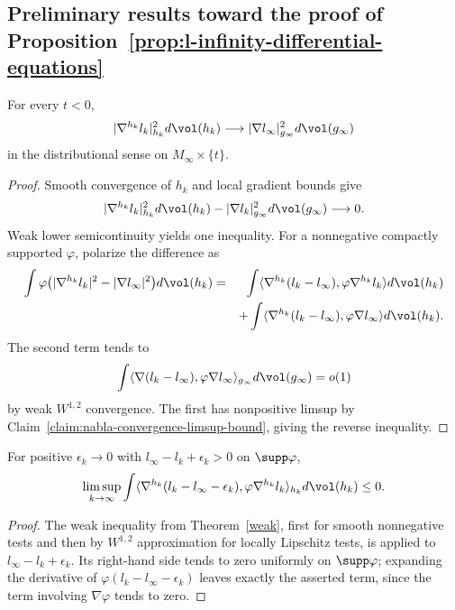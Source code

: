 \subsection{Preliminary results toward the proof of
Proposition~{\ref{prop:l-infinity-differential-equations}}}\label{sect9.2.3}

\begin{lemma}\label{lem:gradient-convergence-distributions}
\label{nablaconv}
For every $t<0$,
\[
 |\nabla^{h_k}l_k|_{h_k}^2d\vol(h_k)
 \longrightarrow |\nabla l_\infty|_{g_\infty}^2d\vol(g_\infty)
\]
in the distributional sense on $M_\infty\times\{t\}$.
\end{lemma}
\begin{proof}
\sketch Smooth convergence of $h_k$ and local gradient bounds give
\begin{equation}\label{firstdist}
 |\nabla^{h_k}l_k|_{h_k}^2d\vol(h_k)
 -|\nabla l_k|_{g_\infty}^2d\vol(g_\infty)\longrightarrow0.
\end{equation}
Weak lower semicontinuity yields one inequality. For a nonnegative
compactly supported $\varphi$, polarize the difference as
\begin{eqnarray}\label{11}
\int\varphi\bigl(|\nabla^{h_k}l_k|^2-|\nabla l_\infty|^2\bigr)d\vol(h_k)
&=&\int\langle\nabla^{h_k}(l_k-l_\infty),
\varphi\nabla^{h_k}l_k\rangle d\vol(h_k)\nonumber\\
&&+\int\langle\nabla^{h_k}(l_k-l_\infty),
\varphi\nabla l_\infty\rangle d\vol(h_k).
\end{eqnarray}
The second term tends to
\begin{equation}\label{12}
 \int\langle\nabla(l_k-l_\infty),
 \varphi\nabla l_\infty\rangle_{g_\infty}d\vol(g_\infty)=o(1)
\end{equation}
by weak $W^{1,2}$ convergence. The first has nonpositive limsup by
Claim~\ref{claim:nabla-convergence-limsup-bound}, giving the reverse
inequality.
\end{proof}

\begin{claim}\label{claim:nabla-convergence-limsup-bound}
For positive $\epsilon_k\to0$ with
$l_\infty-l_k+\epsilon_k>0$ on $\supp\varphi$,
\[
 \limsup_{k\to\infty}\int
 \langle\nabla^{h_k}(l_k-l_\infty-\epsilon_k),
 \varphi\nabla^{h_k}l_k\rangle_{h_k}d\vol(h_k)\leq0.
\]
\end{claim}
\begin{proof}
\sketch The weak inequality from Theorem~\ref{weak}, first for
smooth nonnegative tests and then by $W^{1,2}$ approximation for
locally Lipschitz tests, is applied to
$l_\infty-l_k+\epsilon_k$. Its right-hand side tends to zero
uniformly on $\supp\varphi$; expanding the derivative of
$\varphi(l_k-l_\infty-\epsilon_k)$ leaves exactly the asserted term,
since the term involving $\nabla\varphi$ tends to zero.
\end{proof}

